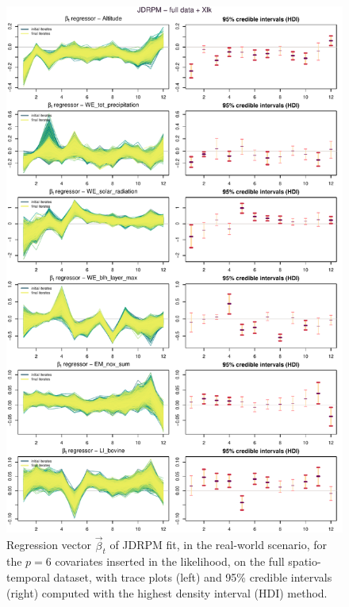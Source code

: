 \documentclass[12pt,	%
	a4paper,		%
	twoside,		%
	openright,		%
	titlepage,%
	]{book}
\theoremstyle{definition}
\begin{document}
\begin{figure}[!p]
    \centering
    \includegraphics[width=1\linewidth]{Testing/Covariates/better likelihood plots/up_LINES_beta_TR_plus_CIJDRPM - full data + Xlk.pdf}
    \caption[Regression vector of JDRPM, covariates in the likelihood, full dataset]{Regression vector $\vec{\beta}_t$ of JDRPM fit, in the real-world scenario, for the $p=6$ covariates inserted in the likelihood, on the full spatio-temporal dataset, with trace plots (left) and 95\% credible intervals (right) computed with the highest density interval (HDI) method.}
    \label{fig: lk regressor altitude and friends full}
\end{figure}
\end{document}
